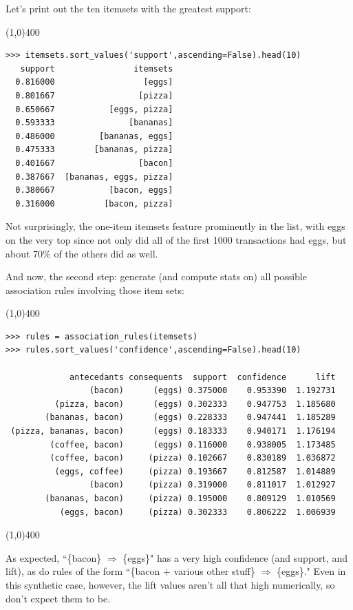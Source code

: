 \documentclass[12pt]{article}
\begin{document}
\vspace{.1in}
Let's print out the ten itemsets with the greatest support:
\footnotesize
\begin{center}
\line(1,0){400}
\end{center}
\begin{Verbatim}[fontsize=\small,samepage=true,frame=none]
>>> itemsets.sort_values('support',ascending=False).head(10)
   support                itemsets
  0.816000                  [eggs]
  0.801667                 [pizza]
  0.650667           [eggs, pizza]
  0.593333               [bananas]
  0.486000         [bananas, eggs]
  0.475333        [bananas, pizza]
  0.401667                 [bacon]
  0.387667  [bananas, eggs, pizza]
  0.380667           [bacon, eggs]
  0.316000          [bacon, pizza]
\end{Verbatim}
\normalsize
\vspace{.3in}
\pagebreak
Not surprisingly, the one-item itemsets feature prominently in the list, with
eggs on the very top since not only did all of the first 1000 transactions had
eggs, but about 70\% of the others did as well.

\vspace{.1in}
And now, the second step: generate (and compute stats on) all possible
association rules involving those item sets:
\begin{center}
\line(1,0){400}
\end{center}
\small
\begin{Verbatim}[fontsize=\small,samepage=true,frame=none]
>>> rules = association_rules(itemsets)
>>> rules.sort_values('confidence',ascending=False).head(10)

             antecedants consequents  support  confidence      lift 
                 (bacon)      (eggs) 0.375000    0.953390  1.192731 
          (pizza, bacon)      (eggs) 0.302333    0.947753  1.185680 
        (bananas, bacon)      (eggs) 0.228333    0.947441  1.185289 
 (pizza, bananas, bacon)      (eggs) 0.183333    0.940171  1.176194 
         (coffee, bacon)      (eggs) 0.116000    0.938005  1.173485 
         (coffee, bacon)     (pizza) 0.102667    0.830189  1.036872 
          (eggs, coffee)     (pizza) 0.193667    0.812587  1.014889 
                 (bacon)     (pizza) 0.319000    0.811017  1.012927 
        (bananas, bacon)     (pizza) 0.195000    0.809129  1.010569 
           (eggs, bacon)     (pizza) 0.302333    0.806222  1.006939 
\end{Verbatim}
\begin{center}
\line(1,0){400}
\end{center}
\normalsize

As expected, ``\{bacon\} $\Rightarrow$ \{eggs\}" has a very high confidence
(and support, and lift), as do rules of the form ``\{bacon + various other
stuff\} $\Rightarrow$ \{eggs\}." Even in this synthetic case, however, the
lift values aren't all that high numerically, so don't expect them to be.
\end{document}

